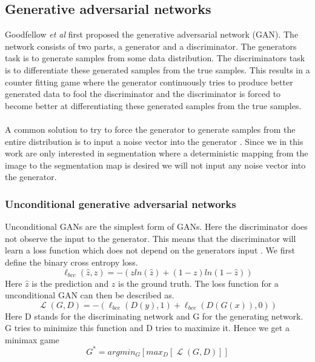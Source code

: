 \documentclass[a4paper,11pt]{article}
\DeclareMathOperator{\Lagr}{\mathcal{L}}
\begin{document}
\subsection{Generative adversarial networks}
Goodfellow \textit{et al} \cite{goodfellow_nips_2016} first proposed the generative adversarial network (GAN). The network consists of two parts, a generator and a discriminator. The generators task is to generate samples from some data distribution. The discriminators task is to differentiate these generated samples from the true samples. This results in a counter fitting game where the generator continuously tries to produce better generated data to fool the discriminator and the discriminator is forced to become better at differentiating these generated samples from the true samples.\\
\\
A common solution to try to force the generator to generate samples from the entire distribution is to input a noise vector into the generator \cite{reed_generative_2016}. Since we in this work are only interested in segmentation where a deterministic mapping from the image to the segmentation map is desired we will not input any  noise vector into the generator.

\subsubsection{Unconditional generative adversarial networks}
Unconditional GANs are the simplest form of GANs. Here the discriminator does not observe the input to the generator. This means that the discriminator will learn a loss function which does not depend on the generators input \cite{isola_image--image_2016}. We first define the binary cross entropy loss.
\begin{equation}\label{eq:bce}
\ell_{bce}(\hat{z}, z)=-(zln(\hat{z})+(1-z)ln(1-\hat{z}))
\end{equation}
Here $\hat{z}$ is the prediction and $z$ is the ground truth.
The loss function for a unconditional GAN can then be described as.
 \begin{equation}
\Lagr(G, D) = -(\ell_{bce}(D(y), 1) + \ell_{bce}(D(G(x)), 0))
\end{equation}
Here D stands for the discriminating network and G for the generating network. G tries to minimize this function and D tries to maximize it. Hence we get a minimax game 
\begin{equation}
G^{*}=argmin_{G}[max_{D}[\Lagr(G, D)]]\label{eq:minimax}
\end{equation}
\end{document}
